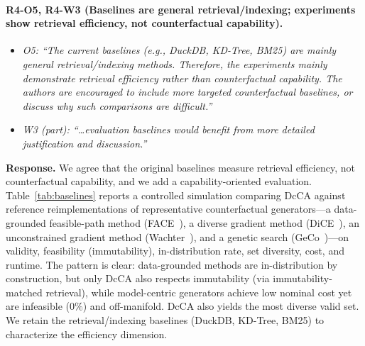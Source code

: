 \paragraph{R4-O5, R4-W3 (Baselines are general retrieval/indexing; experiments show retrieval efficiency, not counterfactual capability).}

\begin{itemize}[leftmargin=1.2em, itemsep=1pt, topsep=2pt]
\item \textit{O5: ``The current baselines (e.g., DuckDB, KD-Tree, BM25) are mainly general retrieval/indexing methods. Therefore, the experiments mainly demonstrate retrieval efficiency rather than counterfactual capability. The authors are encouraged to include more targeted counterfactual baselines, or discuss why such comparisons are difficult.''}
\item \textit{W3 (part): ``\dots evaluation baselines would benefit from more detailed justification and discussion.''}
\end{itemize}
\smallskip

\noindent\textbf{Response.}
We agree that the original baselines measure retrieval efficiency, not counterfactual capability, and we add a capability-oriented evaluation. Table~\ref{tab:baselines} reports a controlled simulation comparing DcCA against reference reimplementations of representative counterfactual generators---a data-grounded feasible-path method (FACE~\cite{poyiadzi2020face}), a diverse gradient method (DiCE~\cite{mothilal2020explaining}), an unconstrained gradient method (Wachter~\cite{wachter2017counterfactual}), and a genetic search (GeCo~\cite{schleich2021geco})---on validity, feasibility (immutability), in-distribution rate, set diversity, cost, and runtime. The pattern is clear: data-grounded methods are in-distribution by construction, but only DcCA also respects immutability (via immutability-matched retrieval), while model-centric generators achieve low nominal cost yet are infeasible ($0\%$) and off-manifold. DcCA also yields the most diverse valid set. We retain the retrieval/indexing baselines (DuckDB, KD-Tree, BM25) to characterize the efficiency dimension.

